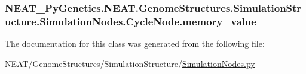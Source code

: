 \subsubsection[{\texorpdfstring{memory\+\_\+value}{memory_value}}]{\setlength{\rightskip}{0pt plus 5cm}N\+E\+A\+T\+\_\+\+Py\+Genetics.\+N\+E\+A\+T.\+Genome\+Structures.\+Simulation\+Structure.\+Simulation\+Nodes.\+Cycle\+Node.\+memory\+\_\+value\hspace{0.3cm}{\ttfamily [static]}}\hypertarget{classNEAT__PyGenetics_1_1NEAT_1_1GenomeStructures_1_1SimulationStructure_1_1SimulationNodes_1_1CycleNode_a6bca28573d3931752d70df4440659de3}{}\label{classNEAT__PyGenetics_1_1NEAT_1_1GenomeStructures_1_1SimulationStructure_1_1SimulationNodes_1_1CycleNode_a6bca28573d3931752d70df4440659de3}


The documentation for this class was generated from the following file\+:\begin{DoxyCompactItemize}
\item 
N\+E\+A\+T/\+Genome\+Structures/\+Simulation\+Structure/\hyperlink{SimulationNodes_8py}{Simulation\+Nodes.\+py}\end{DoxyCompactItemize}
